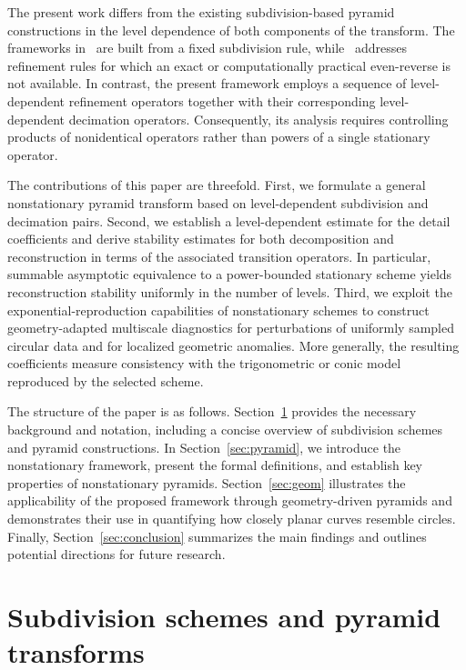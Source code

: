 \documentclass[11pt,a4paper]{article}
\theoremstyle{definition}
\begin{document}
The present work differs from the existing subdivision-based pyramid constructions in the level dependence of both components of the transform. The frameworks in~\cite{dyn2021linear,mattar2023pyramid} are built from a fixed subdivision rule, while~\cite{mattar2023pseudo} addresses refinement rules for which an exact or computationally practical even-reverse is not available. In contrast, the present framework employs a sequence of level-dependent refinement operators together with their corresponding level-dependent decimation operators. Consequently, its analysis requires controlling products of nonidentical operators rather than powers of a single stationary operator.

The contributions of this paper are threefold. First, we formulate a general nonstationary pyramid transform based on level-dependent subdivision and decimation pairs. Second, we establish a level-dependent estimate for the detail coefficients and derive stability estimates for both decomposition and reconstruction in terms of the associated transition operators. In particular, summable asymptotic equivalence to a power-bounded stationary scheme yields reconstruction stability uniformly in the number of levels. Third, we exploit the exponential-reproduction capabilities of nonstationary schemes to construct geometry-adapted multiscale diagnostics for perturbations of uniformly sampled circular data and for localized geometric anomalies. More generally, the resulting coefficients measure consistency with the trigonometric or conic model reproduced by the selected scheme.

The structure of the paper is as follows. Section~\ref{sec:back} provides the necessary background and notation, including a concise overview of subdivision schemes and pyramid constructions. In Section~\ref{sec:pyramid}, we introduce the nonstationary framework, present the formal definitions, and establish key properties of nonstationary pyramids. Section~\ref{sec:geom} illustrates the applicability of the proposed framework through geometry-driven pyramids and demonstrates their use in quantifying how closely planar curves resemble circles. Finally, Section~\ref{sec:conclusion} summarizes the main findings and outlines potential directions for future research.

\section{Subdivision schemes and pyramid transforms} \label{sec:back}
\end{document}
